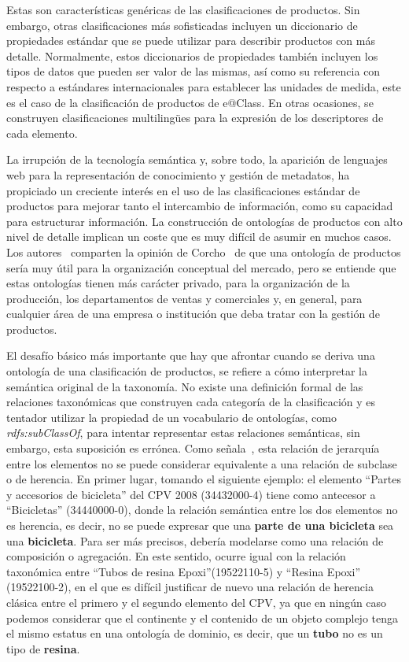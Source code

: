 Estas son características genéricas de las clasificaciones de productos. Sin
embargo, otras clasificaciones más sofisticadas incluyen un diccionario de propiedades
estándar que se puede utilizar para describir productos con más detalle.
Normalmente, estos diccionarios de propiedades también incluyen los tipos de
datos que pueden ser valor de las mismas, así como su referencia con respecto a estándares internacionales para establecer las unidades de medida, este es el caso
de la clasificación de productos de e@Class. En otras ocasiones, se construyen
clasificaciones multiling\"{u}es para la expresión de los descriptores de cada
elemento. 

La irrupción de la tecnología semántica y, sobre todo, la aparición de
lenguajes web para la representación de conocimiento y gestión de metadatos, ha
propiciado un creciente interés en el uso de las clasificaciones estándar de productos para mejorar tanto el
intercambio de información, como su capacidad para estructurar información. La construcción de ontologías de productos 
con alto nivel de detalle implican un coste que es muy difícil de asumir en muchos casos. 
Los autores~\cite{Yu:2009:CSI:1693684.1693743,FenselOmel2001,FenselDing2001} comparten la opinión de Corcho~\cite{CorchoECommerce} 
de que una ontología de productos sería muy útil para la
organización conceptual del mercado, pero se entiende que estas ontologías tienen
más carácter privado, para la organización de la producción, los departamentos
de ventas y comerciales y, en general, para cualquier área de una empresa o
institución que deba tratar con la gestión de productos.

El desafío básico más importante que hay que afrontar cuando se deriva una
ontología de una clasificación de productos, se refiere a cómo interpretar la semántica original de la taxonomía.
No existe una definición formal de las relaciones taxonómicas que construyen
cada categoría de la clasificación y es tentador utilizar la propiedad de un
vocabulario de ontologías, como \textit{rdfs:subClassOf}, para intentar
representar estas relaciones semánticas, sin embargo, esta suposición es errónea. Como señala~\cite{HeppMethodology}, esta relación de jerarquía entre los elementos no se puede considerar
equivalente a una relación de subclase o de herencia. En primer
lugar, tomando el siguiente ejemplo: el elemento ``Partes y accesorios de
bicicleta'' del \gls{CPV} 2008 (34432000-4) tiene como antecesor a ``Bicicletas''
(34440000-0), donde la relación semántica entre los dos elementos no es
herencia, es decir, no se puede expresar que una \textbf{parte de una bicicleta}
sea una \textbf{bicicleta}. Para ser más precisos, debería modelarse como una relación de
composición o agregación. En este sentido, ocurre igual con la relación
taxonómica entre ``Tubos de resina Epoxi''(19522110-5) y ``Resina Epoxi''
(19522100-2), en el que es difícil justificar de nuevo una relación de herencia
clásica entre el primero y el segundo elemento del CPV, ya que en ningún caso
podemos considerar que el continente y el contenido de un objeto complejo tenga
el mismo estatus en una ontología de dominio, es decir, que un \textbf{tubo} no
es un tipo de \textbf{resina}.

